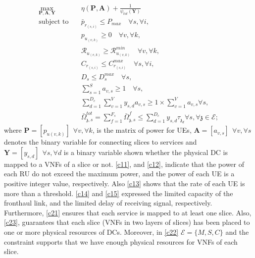 \documentclass[conference]{IEEEtran}
\begin{document}
\begin{subequations}
\begin{alignat}{4}
\max\limits_{\boldsymbol{P}, \boldsymbol{A}, \boldsymbol{Y} }   \quad &   \eta(\boldsymbol{P},\boldsymbol{A})+\frac{1}{\psi_{tot}(\boldsymbol{Y})} \\
\text{subject to} \quad  & \bar{p}_{r_{(s,i)}} \leq P_{max} \quad \forall s, \forall i,
 \label{c11} \\
&p_{u_{(v,k)}}  \geq 0  \quad \forall v, \forall k,\label{c12} \\
&\mathcal{R}_{u_{(v,k)}} \geq  \mathcal{R}_{u_{(v,k)}}^{min} \quad \forall v, \forall k,\label{c13} \\
&C_{r_{(s,i)}} \leq C_{r_{(s,i)}}^{max} \quad \forall s, \forall i, \label{c14}\\
&D_{s} \leq D_{s}^{max} \quad \forall s,\label{c15} \\
& \textstyle  \sum_{s=1}^{S}a_{v,s} \geq 1 \quad \forall s, \label{c21} \\
& \textstyle  \sum_{d=1}^{D_c}\sum_{v=1}^{V}y_{s,d}a_{v,s} \geq 1\times\sum_{v=1}^{V}a_{v,s} \forall s,\label{c23} \\
 &\textstyle  \bar{\Omega}_{\mathfrak{z},s}^{tot} = \sum_{f=1}^{F_s}\bar{\Omega}_{\mathfrak{z},s}^f \leq  \sum_{d=1}^{D_c} y_{s,d} \tau_{\mathfrak{z}_d}  \forall s, \forall \mathfrak{z}\in \mathcal{E}; \label{c22}
\end{alignat}
\label{constraints}
\end{subequations}
where $\boldsymbol{P} =[p_{u(v,k)}] \:\: \forall v , \forall k $, is the matrix of power for UEs, $\boldsymbol{A} =[a_{v,s}] \:\: \forall v , \forall s $ denotes the binary variable for connecting slices to services and $\boldsymbol{Y} =[y_{s,d}]  \:\: \forall s ,  \forall d $ is a binary variable shown whether
the physical DC is mapped to a VNFs of a slice or not.
\eqref{c11}, and \eqref{c12}, indicate that the power of each RU do not exceed the maximum power, and the power of each UE is a positive integer value, respectively. Also \eqref{c13} shows that the rate of each UE is more than a threshold. \eqref{c14} and \eqref{c15} expressed the limited capacity of the fronthaul link, and the limited delay of receiving signal, respectively.
Furthermore, \eqref{c21}
ensures that each service is mapped to at least one slice.
Also, \eqref{c23}, guarantees that each slice (VNFs in two layers of slices) has been placed to one or more physical resources of DCs. Moreover, in \eqref{c22}  $\mathcal{E} = \{M,S,C\}$ and the constraint supports
that we have enough physical resources for VNFs of each slice.\newline
\end{document}
